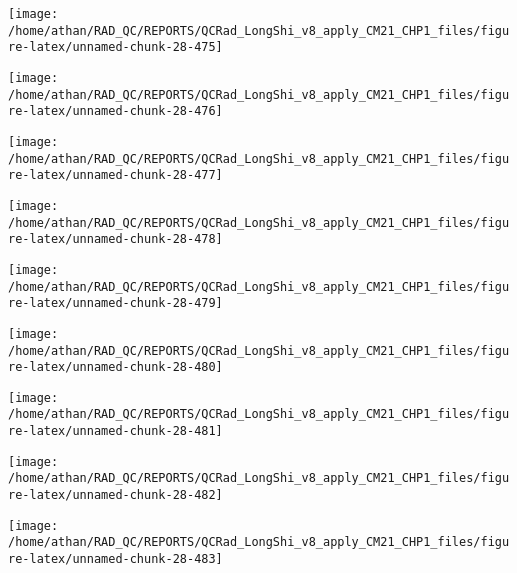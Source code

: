\documentclass[
  10pt,
  a4paper,oneside]{article}
\begin{document}
\begin{center}\texttt{[image: /home/athan/RAD\_QC/REPORTS/QCRad\_LongShi\_v8\_apply\_CM21\_CHP1\_files/figure-latex/unnamed-chunk-28-475]} \end{center}

\begin{center}\texttt{[image: /home/athan/RAD\_QC/REPORTS/QCRad\_LongShi\_v8\_apply\_CM21\_CHP1\_files/figure-latex/unnamed-chunk-28-476]} \end{center}

\begin{center}\texttt{[image: /home/athan/RAD\_QC/REPORTS/QCRad\_LongShi\_v8\_apply\_CM21\_CHP1\_files/figure-latex/unnamed-chunk-28-477]} \end{center}

\begin{center}\texttt{[image: /home/athan/RAD\_QC/REPORTS/QCRad\_LongShi\_v8\_apply\_CM21\_CHP1\_files/figure-latex/unnamed-chunk-28-478]} \end{center}

\begin{center}\texttt{[image: /home/athan/RAD\_QC/REPORTS/QCRad\_LongShi\_v8\_apply\_CM21\_CHP1\_files/figure-latex/unnamed-chunk-28-479]} \end{center}

\begin{center}\texttt{[image: /home/athan/RAD\_QC/REPORTS/QCRad\_LongShi\_v8\_apply\_CM21\_CHP1\_files/figure-latex/unnamed-chunk-28-480]} \end{center}

\begin{center}\texttt{[image: /home/athan/RAD\_QC/REPORTS/QCRad\_LongShi\_v8\_apply\_CM21\_CHP1\_files/figure-latex/unnamed-chunk-28-481]} \end{center}

\begin{center}\texttt{[image: /home/athan/RAD\_QC/REPORTS/QCRad\_LongShi\_v8\_apply\_CM21\_CHP1\_files/figure-latex/unnamed-chunk-28-482]} \end{center}

\begin{center}\texttt{[image: /home/athan/RAD\_QC/REPORTS/QCRad\_LongShi\_v8\_apply\_CM21\_CHP1\_files/figure-latex/unnamed-chunk-28-483]} \end{center}
\end{document}
